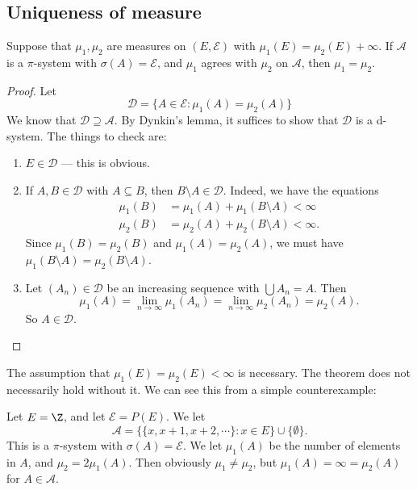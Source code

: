 \documentclass[a4paper]{article}
\begin{document}
\subsection{Uniqueness of measure}
\begin{thm}
  Suppose that $\mu_1, \mu_2$ are measures on $(E, \mathcal{E})$ with $\mu_1(E) = \mu_2(E) + \infty$. If $\mathcal{A}$ is a $\pi$-system with $\sigma(A) = \mathcal{E}$, and $\mu_1$ agrees with $\mu_2$ on $\mathcal{A}$, then $\mu_1 = \mu_2$.
\end{thm}

\begin{proof}
  Let
  \[
    \mathcal{D} = \{A \in \mathcal{E}: \mu_1(A) = \mu_2(A)\}
  \]
  We know that $\mathcal{D} \supseteq \mathcal{A}$. By Dynkin's lemma, it suffices to show that $\mathcal{D}$ is a d-system. The things to check are:
\begin{enumerate}
  \item $E \in \mathcal{D}$ --- this is obvious.
  \item If $A, B \in \mathcal{D}$ with $A \subseteq B$, then $B \setminus A \in \mathcal{D}$. Indeed, we have the equations
    \begin{align*}
      \mu_1(B) &= \mu_1(A) + \mu_1(B \setminus A) < \infty\\
      \mu_2(B) &= \mu_2(A) + \mu_2(B \setminus A) < \infty.
    \end{align*}
    Since $\mu_1(B) = \mu_2(B)$ and $\mu_1(A) = \mu_2(A)$, we must have $\mu_1(B \setminus A) = \mu_2(B \setminus A)$.
  \item Let $(A_n) \in \mathcal{D}$ be an increasing sequence with $\bigcup A_n = A$. Then
    \[
      \mu_1(A) = \lim_{n \to \infty}\mu_1(A_n) = \lim_{n \to \infty} \mu_2(A_n) = \mu_2(A).
    \]
    So $A \in\mathcal{D}$.
\end{enumerate}
\end{proof}
The assumption that $\mu_1(E) = \mu_2(E) < \infty$ is necessary. The theorem does not necessarily hold without it. We can see this from a simple counterexample:

\begin{eg}
  Let $E = \Z$, and let $\mathcal{E} = P(E)$. We let
  \[
    \mathcal{A} = \{\{x, x+1, x+2, \cdots\}: x \in E\} \cup \{\emptyset\}.
  \]
  This is a $\pi$-system with $\sigma(A) = \mathcal{E}$. We let $\mu_1(A)$ be the number of elements in $A$, and $\mu_2 = 2\mu_1(A)$. Then obviously $\mu_1 \not= \mu_2$, but $\mu_1(A) = \infty = \mu_2(A)$ for $A \in \mathcal{A}$.
\end{eg}
\end{document}
